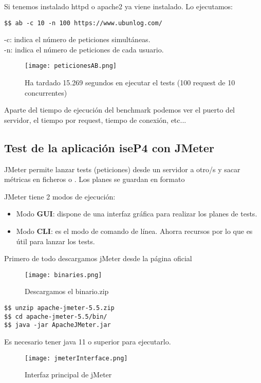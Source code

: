 Si tenemos instalado httpd o apache2 ya viene instalado. Lo ejecutamos:
\begin{verbatim}
$$ ab -c 10 -n 100 https://www.ubunlog.com/
\end{verbatim}
-c: indica el número de peticiones simultáneas.\\
-n: indica el número de peticiones de cada usuario.

\begin{figure}[H]
	\centering
	\texttt{[image: peticionesAB.png]}
	\caption{Ha tardado 15.269 segundos en ejecutar el tests (100 request de 10 concurrentes)}
\end{figure}
Aparte del tiempo de ejecución del benchmark podemos ver el puerto del servidor, el tiempo por request, tiempo de conexión, etc...
\subsection{Test de la aplicación iseP4 con JMeter}
JMeter permite lanzar tests (peticiones) desde un servidor a otro/s y sacar métricas en ficheros  o . Los planes se guardan en formato 

JMeter tiene 2 modos de ejecución:
\begin{itemize}
	\item Modo \textbf{GUI}: dispone de una interfaz gráfica para realizar los planes de tests.
	\item Modo \textbf{CLI}: es el modo de comando de línea. Ahorra recursos por lo que es útil para lanzar los tests.
\end{itemize}
Primero de todo descargamos jMeter desde la página oficial \cite{jmeterWeb}
\begin{figure}[H]
	\centering
	\texttt{[image: binaries.png]}
	\caption{Descargamos el binario.zip}
\end{figure}

\begin{verbatim}
$$ unzip apache-jmeter-5.5.zip
$$ cd apache-jmeter-5.5/bin/
$$ java -jar ApacheJMeter.jar
\end{verbatim}
Es necesario tener java 11 o superior para ejecutarlo.

\begin{figure}[H]
	\centering
	\texttt{[image: jmeterInterface.png]}
	\caption{Interfaz principal de jMeter}
\end{figure}

\newpage

